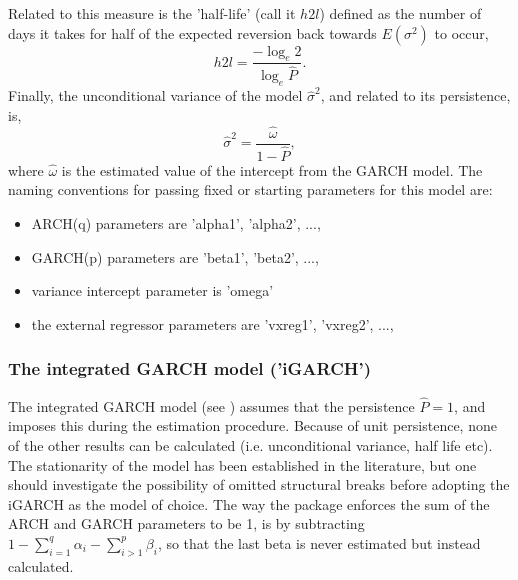 Related to this measure is the 'half-life' (call it $h2l$) defined as the number
of days it takes for half of the expected reversion back
towards $E\left( {{\sigma ^2}} \right)$ to occur,
\begin{equation}\label{eq:sgarchh2l}
h2l = \frac{{ - {{\log }_e}2}}{{{{\log }_e}\hat P}}.
\end{equation}
Finally, the unconditional variance of the model ${\hat \sigma }^2$, and related
to its persistence, is,
\begin{equation}\label{eq:sgarchuncv}
{{\hat \sigma }^2} = \frac{{\hat \omega }}{{1 - \hat P}},
\end{equation}
where $\hat \omega$ is the estimated value of the intercept from the GARCH model.
The naming conventions for passing fixed or starting parameters for this model
are:
\begin{itemize}
\item ARCH(q) parameters are 'alpha1', 'alpha2', ...,
\item GARCH(p) parameters are 'beta1', 'beta2', ...,
\item variance intercept parameter is 'omega'
\item the external regressor parameters are 'vxreg1', 'vxreg2', ...,
\end{itemize}

\subsubsection{The integrated GARCH model ('iGARCH')}\label{section:igarch}
The integrated GARCH model (see \cite{Engle1986}) assumes that the
persistence $\hat P = 1$, and imposes this during the estimation procedure.
Because of unit persistence, none of the other results can be calculated
(i.e. unconditional variance, half life etc). The stationarity of the model has
been established in the literature, but one should investigate the possibility
of omitted structural breaks before adopting the iGARCH as the model of choice.
The way the package enforces the sum of the ARCH and GARCH parameters to be 1,
is by subtracting $1 - \sum\limits_{i = 1}^q {{\alpha _i} - } \sum\limits_{i > 1}^p {{\beta _i}}$,
so that the last beta is never estimated but instead calculated.
